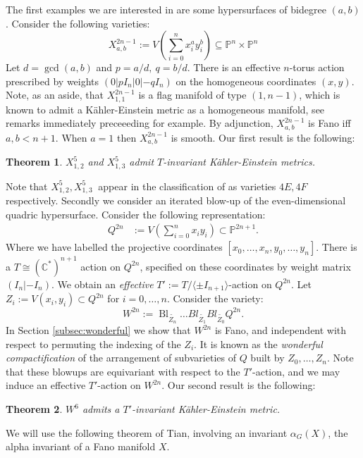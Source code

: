 \documentclass{amsart}
\newtheorem{theorem}{Theorem}[section]
\theoremstyle{definition}
\newcommand{\CC}{\mathbb{C}}
\newcommand{\PP}{\mathbb{P}}
\DeclareMathOperator{\Bl}{Bl}
\begin{document}
The first examples we are interested in are some hypersurfaces of  bidegree \((a,b)\). Consider the following varieties:
\[
X_{a,b}^{2n-1} := V \left( \sum_{i=0}^n x_i^a y_i^b \right) \subseteq \PP^n \times \PP^n
\]
%
%
%
%
%
%
Let \(d = \gcd(a,b)\) and \(p= a/d, \ q = b/d\). There is an effective \(n\)-torus action prescribed by weights  \((0|pI_n|0|-qI_n)\) on the homogeneous coordinates \((x,y)\). Note, as an aside, that \(X^{2n-1}_{1,1}\) is a flag manifold of type \((1,n-1)\), which is known to admit a K\"ahler-Einstein metric as a homogeneous manifold, see remarks immediately preceeeding \cite[Theorem 3]{Matsushima} for example. By adjunction, \(X^{2n-1}_{a,b}\) is Fano iff \(a,b < n+1\). When \(a = 1\) then \(X^{2n-1}_{a,b}\) is smooth. Our first result is the following:
\begin{theorem}\label{thm:KE1}
\(X_{1,2}^5\) and \( X_{1,3}^5\) admit \(T\)-invariant K\"ahler-Einstein metrics.
\end{theorem}
Note that \(X_{1,2}^5, X_{1,3}^5\ \) appear in the classification of \cite{hausen2018torus} as varieties \(4E, 4F\) respectively. Secondly we consider an iterated blow-up of the even-dimensional quadric hypersurface. Consider the following representation:
\begin{align*}
Q^{2n} &:= V \left( \sum_{i=0}^{n} x_{i}y_{i} \right) \subset \PP^{2n+1}.
\end{align*}
Where we have labelled the projective coordinates \([x_0,\dots,x_n,y_0,\dots,y_n]\). There is a \(T \cong (\CC^*)^{n+1}\) action on \(Q^{2n}\), specified on these coordinates by weight matrix \((I_n| - I_n)\). We obtain an \textit{effective} \(T' := T / \langle \pm I_{n+1} \rangle \)-action on \(Q^{2n}\). Let \(Z_i := V(x_{i},y_i) \subset Q^{2n}\) for \(i=0,\dots,n\). Consider the variety:
\[
W^{2n} := \Bl_{\tilde{Z_n}}  \dots Bl_{\tilde{Z_1}}  Bl_{\tilde{Z_0}} Q^{2n}.
\]
In Section \ref{subsec:wonderful} we show that \(W^{2n}\) is Fano, and independent with respect to permuting the indexing of the \(Z_i\). It is known as the \textit{wonderful compactification} of the arrangement of subvarieties of \(Q\) built by \(Z_0,\dots,Z_n\). Note that these blowups are equivariant with respect to the \(T'\)-action, and we may induce an effective \(T'\)-action on \(W^{2n}\). Our second result is the following:
\begin{theorem}\label{thm:KE2}
\(W^6\) admits a \(T'\)-invariant K\"ahler-Einstein metric.
\end{theorem}
We will use the following theorem of Tian, involving an invariant \(\alpha_{G}(X)\), the alpha invariant of a Fano manifold \(X\).
\end{document}
